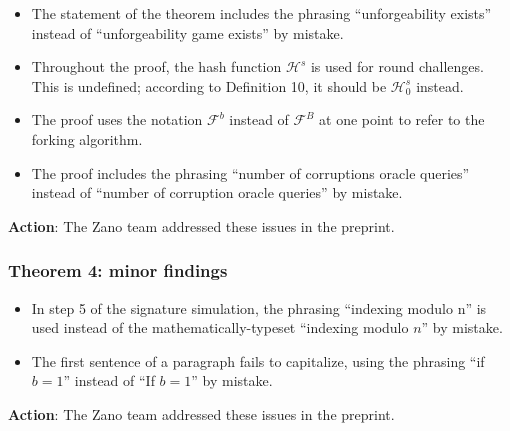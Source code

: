 \documentclass{article}
\begin{document}
\begin{itemize}
	\item The statement of the theorem includes the phrasing ``unforgeability exists'' instead of ``unforgeability game exists'' by mistake.
	
	\item Throughout the proof, the hash function $\mathcal{H}^s$ is used for round challenges.
	This is undefined; according to Definition 10, it should be $\mathcal{H}_0^s$ instead.

	\item The proof uses the notation $\mathcal{F}^b$ instead of $\mathcal{F}^B$ at one point to refer to the forking algorithm.
	
	\item The proof includes the phrasing ``number of corruptions oracle queries'' instead of ``number of corruption oracle queries'' by mistake.
\end{itemize}

\textbf{Action}: The Zano team addressed these issues in the preprint.


\subsubsection{Theorem 4: minor findings}

\begin{itemize}
	\item In step 5 of the signature simulation, the phrasing ``indexing modulo n'' is used instead of the mathematically-typeset ``indexing modulo $n$'' by mistake.
	
	\item The first sentence of a paragraph fails to capitalize, using the phrasing ``if $b = 1$'' instead of ``If $b = 1$'' by mistake.
\end{itemize}

\textbf{Action}: The Zano team addressed these issues in the preprint.




\end{document}
